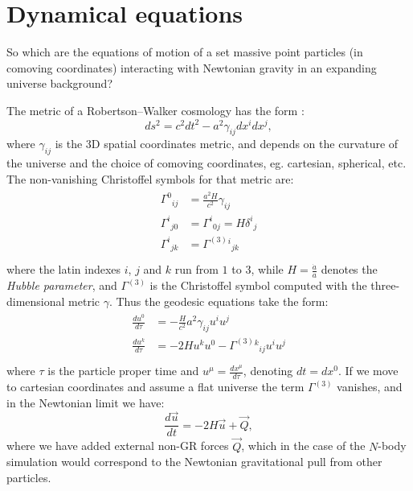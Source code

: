 \section{Dynamical equations}

\noindent So which are the equations of motion of
a set massive point particles (in comoving coordinates)
interacting with Newtonian gravity in an expanding universe background?

The metric of a Robertson--Walker cosmology has the form \cite{cosmology}:
\begin{equation}
    ds^2 = c^2 dt^2 - a^2 \gamma_{ij} dx^i dx^j,
\end{equation}
where $\gamma_{ij}$ is the 3D spatial coordinates metric,
and depends on the curvature of the universe and the choice
of comoving coordinates, eg. cartesian, spherical, etc.
The non-vanishing Christoffel symbols for that metric are:
\begin{align}
    \begin{split}
        \Gamma^0{}_{ij} &= \frac{a^2 H }{ c^2} \gamma_{ij} \\
        \Gamma^i{}_{j0} &= \Gamma^i{}_{0j} = H \delta^i{}_j\\
        \Gamma^i{}_{jk} &= \Gamma^{(3)}{}^i{}_{jk}\\
    \end{split}
\end{align}
where the latin indexes $i$, $j$ and $k$ run from $1$ to $3$,
while $H = \frac{\dot a }{ a}$ denotes the \emph{Hubble parameter},
and $\Gamma^{(3)}$ is the Christoffel symbol computed with
the three-dimensional metric $\gamma$.
Thus the geodesic equations take the form:
\begin{align}
    \begin{split}
    \frac{d u^0}{ d\tau} &= - \frac{H }{ c^2} a^2\gamma_{ij} u^i u^j\\
    \frac{d u^k}{ d\tau} &= - 2 H u^k u^0 - \Gamma^{(3)}{}^k{}_{ij} u^i u^j\\
    \end{split}
\end{align}
where $\tau$ is the particle proper time and $u^{\mu} = \frac{d x^{\mu}}{ d\tau}$,
denoting $dt = dx^0$.
If we move to cartesian coordinates and assume a flat universe the 
term $\Gamma^{(3)}$ vanishes, and in the Newtonian limit we have:
\begin{equation}
    \frac{ d \vec u }{ dt}
     = -2 H \vec u + \vec Q,
    \label{eq:motion1}
\end{equation}
where we have added external non-GR forces $\vec Q$, which
in the case of the $N$-body simulation would correspond
to the Newtonian gravitational pull from other particles.

